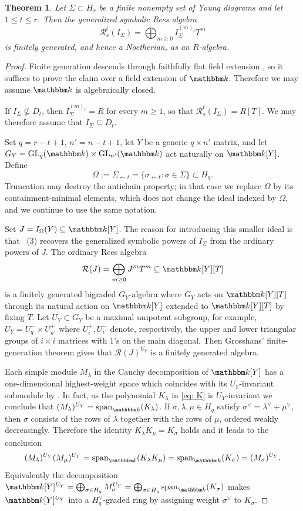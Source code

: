 \documentclass[11pt, reqno]{amsart}
\numberwithin{equation}{section}
\newtheorem{theorem}{Theorem}[section]
\theoremstyle{definition}
\DeclareMathOperator{\GL}{GL}
\newcommand{\kk}{{\mathbbm k}}
\renewcommand{\l}{\lambda}
\newcommand{\s}{\sigma}
\begin{document}
\begin{theorem}\label{thm: symbolic Rees Sigma}
Let $\Sigma\subset H_r$ be a finite nonempty set of Young diagrams and let $1\leq t\leq r$. Then the generalized symbolic Rees algebra
\[
\mathcal R_s^t(I_\Sigma)=\bigoplus_{m\geq0}I_\Sigma^{(m)_t}T^m
\]
is  finitely generated, and hence a Noetherian, as an $R$-algebra.
\end{theorem}

\begin{proof}
Finite generation descends through faithfully flat field extension \cite{StacksProject}, so it suffices to prove the claim over a  field extension of $\kk$. Therefore we may assume $\kk$ is algebraically closed.

If $I_\Sigma\not\subseteq D_t$, then $I_\Sigma^{(m)_t}=R$ for every $m\geq1$, so that $\mathcal R_s^t(I_\Sigma)=R[T]$. We may therefore assume that $I_\Sigma\subseteq D_t$.

Set $q=r-t+1$, $n'=n-t+1$, let $Y$ be a generic $q\times n'$ matrix, and let
$
G_Y=\GL_q(\kk )\times \GL_{n'}(\kk)
$
act naturally on $\kk[Y]$.
Define
\[
\Omega:=\Sigma_{\leftarrow t}
=\bigl\{\sigma_{\leftarrow t}:\sigma\in\Sigma\bigr\}\subset H_q.
\]
 Truncation may destroy the antichain property; in that case we
replace $\Omega$ by its containment-minimal elements, which does not change
the ideal indexed by $\Omega$, and we continue to use the same notation.

Set $J=I_\Omega(Y)\subseteq\kk[Y]$.
The reason for introducing this
smaller ideal is that ~(3) recovers the generalized symbolic
powers of $I_\Sigma$ from the ordinary powers of $J$.
The ordinary Rees algebra
\[
\mathcal R(J)=\bigoplus_{m\geq0}J^mT^m \subseteq \kk[Y][T]
\]
is a finitely generated bigraded $G_Y$-algebra where  $G_Y$ acts on $\kk[Y][T]$ through its natural action on  $\kk[Y]$ extended to $\kk[Y][T]$ by  fixing $T$.  Let $U_Y\subset G_Y$ be a maximal unipotent subgroup, for example, $U_Y=U^-_q\times U^+_{n'}$ where $U^+_i, U^-_i$ denote, respectively,  the upper and lower triangular groups of $i\times i$ matrices with 1's on the main diagonal.
Then Grosshans' finite-generation theorem
\cite{Grosshans1983}  gives that
$\mathcal R(J)^{U_Y}$ is a finitely generated algebra.

Each simple module $M_\lambda$ in the Cauchy decomposition of $\kk[Y]$ has a one-dimensional highest-weight space which coincides with its $U_Y$-invariant submodule by \cite[Theorem 2.4]{Brion2010}. In fact, as the polynomial $K_\l$ in \eqref{eq: K} is $U_Y$-invariant we conclude that $(M_\lambda)^{U_Y}=\operatorname{span}_{\kk}(K_\l)$.
If $\s,\lambda, \mu\in H_q$ satisfy $\sigma^\vee=\lambda^\vee+\mu^\vee$, then $\sigma$ consists of the rows of $\lambda$ together with the rows of $\mu$, ordered weakly decreasingly. Therefore the identity $K_\l K_\mu=K_\s$ holds and it leads to the conclusion
\[(M_\l )^{U_Y} ( M_\mu)^{U_Y}=\operatorname{span}_{\kk}(K_\l K_\mu)=\operatorname{span}_{\kk}(K_\s)=(M_\s)^{U_Y}.\]
Equivalently the decomposition $\kk[Y]^{U_Y}=\bigoplus_{\s\in H_q} M_\s^{U_Y}=\bigoplus_{\s\in H_q} \operatorname{span}_{\kk}(K_\s)$ makes   $\kk[Y]^{U_Y}$ into a $H_q^\vee$-graded ring by assigning weight $\s^\vee$ to $K_\s$.


\end{proof}
\end{document}

